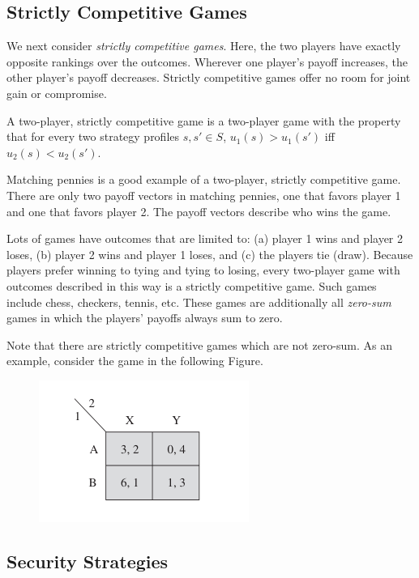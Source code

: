 \subsection{Strictly Competitive Games}

We next consider \emph{strictly competitive games}. Here, the two players have exactly opposite rankings over the outcomes. Wherever one player’s payoff increases, the other player’s payoff decreases. Strictly competitive games offer no room for joint gain or compromise.

\begin{definition}
A two-player, strictly competitive game is a two-player game with the property that for every two strategy profiles $s, s' \in S$, $u_1(s) > u_1(s')$ iff $u_2(s) < u_2(s')$.
\end{definition}

Matching pennies is a good example of a two-player, strictly competitive game. There are only two payoff vectors in matching pennies, one that favors player 1 and one that favors player 2. The payoff vectors describe
who wins the game.

Lots of games have outcomes that are limited to: (a) player 1 wins and player 2 loses, (b) player 2 wins and player 1
loses, and (c) the players tie (draw). Because players prefer winning to tying and tying to losing, every two-player game with outcomes described in this way is a strictly competitive game. Such games include chess, checkers, tennis, etc. These games are additionally all \emph{zero-sum} games in which the players’ payoffs always sum to zero.

Note that there are strictly competitive games which are not zero-sum. As an example, consider the game in the following Figure.

\begin{figure}[H]
    \centering
    \includegraphics[scale=0.7]{images/2023-11-24-game_theory_02.png}
\end{figure}

\subsection{Security Strategies}

